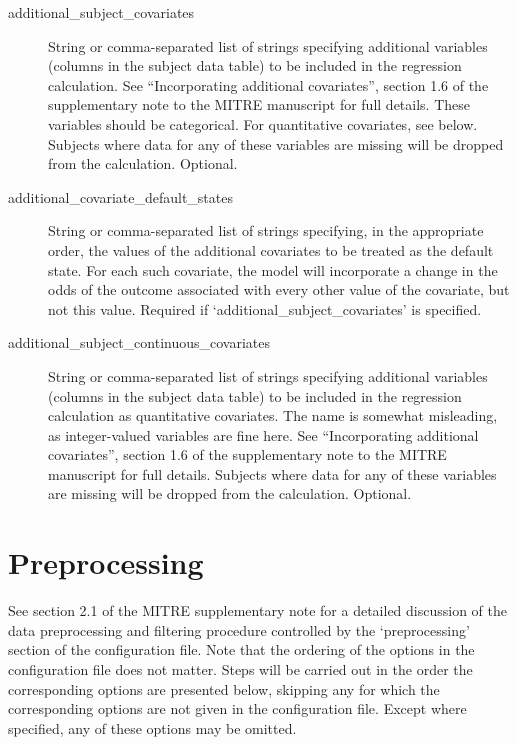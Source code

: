\documentclass[12pt]{report}
\begin{document}
\begin{description}
\item[additional\_subject\_covariates] String or comma-separated list
  of strings specifying additional variables (columns in the subject
  data table) to be included in the regression calculation. See
  ``Incorporating additional covariates'', section 1.6 of the
  supplementary note to the MITRE manuscript for full details. These
  variables should be categorical. For quantitative covariates, see
  below. Subjects where data for any of these variables
  are missing will be dropped from the calculation. Optional.
\item[additional\_covariate\_default\_states] String or
  comma-separated list of strings specifying, in the appropriate
  order, the values of the additional covariates to be treated as the
  default state. For each such covariate, the model will incorporate a
  change in the odds of the outcome associated with every other value
  of the covariate, but not this value. Required if
  `additional\_subject\_covariates' is specified.
\item[additional\_subject\_continuous\_covariates] String or
  comma-separated list of strings specifying additional variables
  (columns in the subject data table) to be included in the regression
  calculation as quantitative covariates. The name is somewhat
  misleading, as integer-valued variables are fine here. See
  ``Incorporating additional covariates'', section 1.6 of the
  supplementary note to the MITRE manuscript for full
  details. Subjects where data for any of these variables are missing
  will be dropped from the calculation. Optional.
\end{description}

\section{Preprocessing}\label{preprocessing}
See section 2.1 of the MITRE supplementary note for a detailed
discussion of the data preprocessing and filtering procedure
controlled by the `preprocessing' section of the configuration
file. Note that the ordering of the options in the configuration file
does not matter.  Steps will be carried out in the order the
corresponding options are presented below, skipping any for which the
corresponding options are not given in the configuration file. Except
where specified, any of these options may be omitted.
\end{document}
